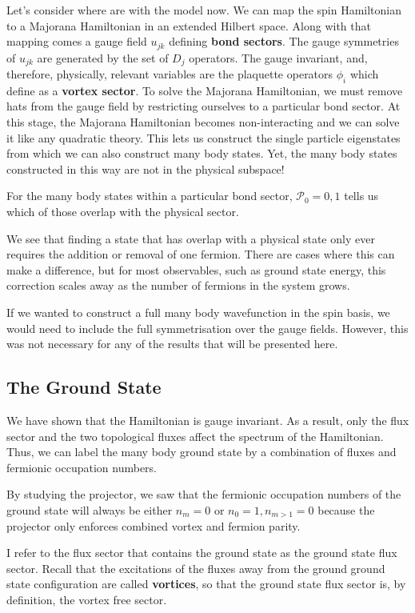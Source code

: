 Let's consider where are with the model now. We can map the spin Hamiltonian to a Majorana Hamiltonian in an extended Hilbert space. Along with that mapping comes a gauge field \(u_{jk}\) defining \textbf{bond sectors}. The gauge symmetries of \(u_{jk}\) are generated by the set of \(D_j\) operators. The gauge invariant, and, therefore, physically, relevant variables are the plaquette operators \(\phi_i\) which define as a \textbf{vortex sector}. To solve the Majorana Hamiltonian, we must remove hats from the gauge field by restricting ourselves to a particular bond sector. At this stage, the Majorana Hamiltonian becomes non-interacting and we can solve it like any quadratic theory. This lets us construct the single particle eigenstates from which we can also construct many body states. Yet, the many body states constructed in this way are not in the physical subspace!

For the many body states within a particular bond sector, \(\mathcal{P}_0 = 0,1\) tells us which of those overlap with the physical sector.

We see that finding a state that has overlap with a physical state only ever requires the addition or removal of one fermion. There are cases where this can make a difference, but for most observables, such as ground state energy, this correction scales away as the number of fermions in the system grows.

If we wanted to construct a full many body wavefunction in the spin basis, we would need to include the full symmetrisation over the gauge fields. However, this was not necessary for any of the results that will be presented here.

\hypertarget{the-ground-state}{%
\subsection{The Ground State}\label{the-ground-state}}

We have shown that the Hamiltonian is gauge invariant. As a result, only the flux sector and the two topological fluxes affect the spectrum of the Hamiltonian. Thus, we can label the many body ground state by a combination of fluxes and fermionic occupation numbers.

By studying the projector, we saw that the fermionic occupation numbers of the ground state will always be either \(n_m = 0\) or \(n_0 = 1, n_{m>1} = 0\) because the projector only enforces combined vortex and fermion parity.

I refer to the flux sector that contains the ground state as the ground state flux sector. Recall that the excitations of the fluxes away from the ground ground state configuration are called \textbf{vortices}, so that the ground state flux sector is, by definition, the vortex free sector.

